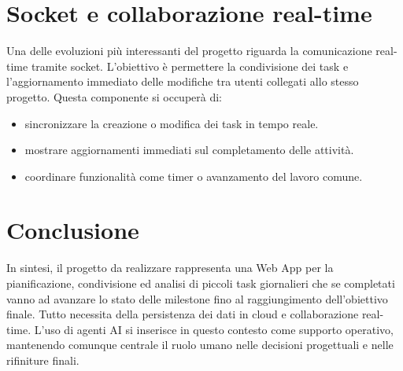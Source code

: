 \documentclass[12pt,a4paper]{article}
\begin{document}
\section{Socket e collaborazione real-time}
Una delle evoluzioni pi\`u interessanti del progetto riguarda la comunicazione real-time tramite socket.
L'obiettivo \`e permettere la condivisione dei task e l'aggiornamento immediato delle modifiche tra utenti collegati allo stesso progetto.
Questa componente si occuperà di:
\begin{itemize}
    \item sincronizzare la creazione o modifica dei task in tempo reale.
    \item mostrare aggiornamenti immediati sul completamento delle attività.
    \item coordinare funzionalit\`a come timer o avanzamento del lavoro comune.
\end{itemize}

\section{Conclusione}
In sintesi, il progetto da realizzare rappresenta una Web App per la pianificazione, condivisione ed analisi di piccoli task giornalieri che se completati vanno ad avanzare lo stato delle milestone fino al raggiungimento dell'obiettivo finale. 
Tutto necessita della persistenza dei dati in cloud e collaborazione real-time. 
L'uso di agenti AI si inserisce in questo contesto come supporto operativo, mantenendo comunque centrale il ruolo umano nelle decisioni progettuali e nelle rifiniture finali.
\end{document}
